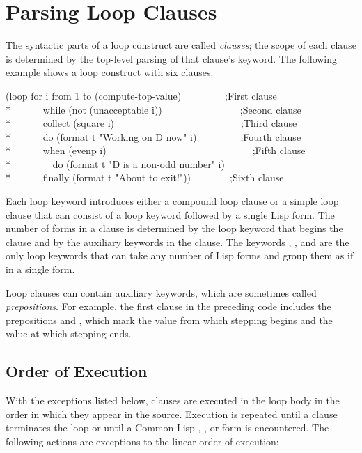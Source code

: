   \section{Parsing Loop Clauses}

  The syntactic parts of a loop construct are called {\it clauses}; the scope
  of each clause is determined by the top-level parsing of that clause's
  keyword.  The following example shows a loop construct with six
  clauses:

\begin{lisp}
(loop for i from 1 to (compute-top-value)~~~~~~~~~;{\rm First clause} \\*
~~~~~~while (not (unacceptable i))~~~~~~~~~~~~~~~~;{\rm Second clause} \\*
~~~~~~collect (square i)~~~~~~~~~~~~~~~~~~~~~~~~~~;{\rm Third clause} \\*
~~~~~~do (format t "Working on {\Xtilde}D now" i)~~~~~~~~~;{\rm Fourth clause} \\*
~~~~~~when (evenp i)~~~~~~~~~~~~~~~~~~~~~~~~~~~~~~;{\rm Fifth clause} \\*
~~~~~~~~do (format t "{\Xtilde}D is a non-odd number" i) \\*
~~~~~~finally (format t "About to exit!"))~~~~~~~~;{\rm Sixth clause}
\end{lisp}


  Each loop keyword introduces either a compound loop clause or a simple
  loop clause that can consist of a loop keyword followed by a 
  single Lisp form.  The number of
  forms in a clause is determined by the loop keyword that begins the
  clause and by the auxiliary keywords in the clause.  The keywords
  , , and  are the only loop
  keywords that can take any number of Lisp forms and group them as if
  in a single  form.

  Loop clauses can contain auxiliary keywords, which are sometimes
  called {\it prepositions}.  For example, the first clause in the preceding code
  includes the prepositions  and , which mark
  the value from which stepping begins and the value at which stepping
  ends.

  \subsection{Order of Execution}

  With the exceptions listed below, clauses are executed in the loop body
  in the order in which they appear in the source.  Execution is repeated 
  until a clause
  terminates the loop or until a Common Lisp ,
  , or  form is encountered.  The following actions are
  exceptions to the linear order of execution:

